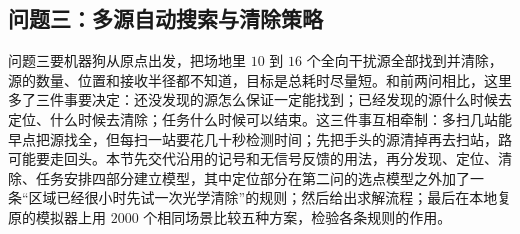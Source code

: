 \subsection{问题三：多源自动搜索与清除策略}\label{sec:q3}

问题三要机器狗从原点出发，把场地里 $10$ 到 $16$ 个全向干扰源全部找到并清除，源的数量、位置和接收半径都不知道，目标是总耗时尽量短。和前两问相比，这里多了三件事要决定：还没发现的源怎么保证一定能找到；已经发现的源什么时候去定位、什么时候去清除；任务什么时候可以结束。这三件事互相牵制：多扫几站能早点把源找全，但每扫一站要花几十秒检测时间；先把手头的源清掉再去扫站，路可能要走回头。本节先交代沿用的记号和无信号反馈的用法，再分发现、定位、清除、任务安排四部分建立模型，其中定位部分在第二问的选点模型之外加了一条“区域已经很小时先试一次光学清除”的规则；然后给出求解流程；最后在本地复原的模拟器上用 $2000$ 个相同场景比较五种方案，检验各条规则的作用。

%
%
%
%
%
